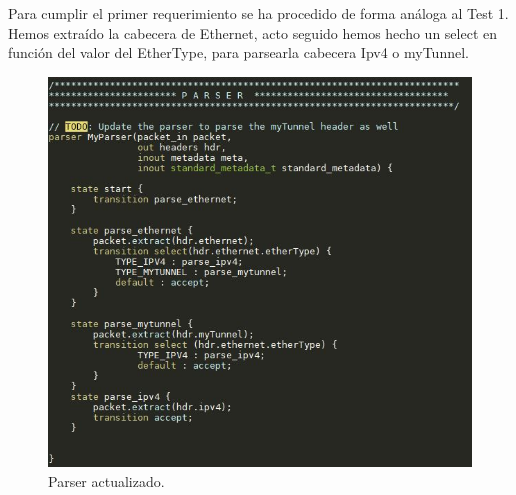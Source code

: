 Para cumplir el primer requerimiento se ha procedido de forma análoga al Test 1. Hemos extraído la cabecera de Ethernet, acto seguido hemos hecho un select en función del valor del EtherType, para parsearla cabecera Ipv4 o myTunnel.
\begin{figure}[!htb]
  \centering
    \includegraphics[width=0.7\linewidth]{./img/test/9.JPG}
    \caption{Parser actualizado.}
  \label{fig:yo}
\end{figure}

